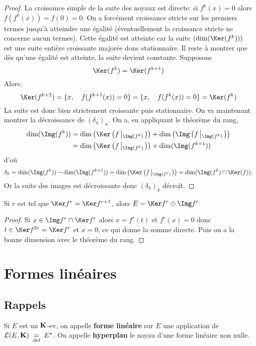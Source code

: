 \begin{proof}
    La croissance simple de la suite des noyaux est directe: si $f^k(x)=0$ alors $f(f^k(x))=f(0)=0$. On a forcément croissance stricte sur les premiers termes jusqu'à atteindre une égalité (éventuellement la croissance stricte ne concerne aucun termes). Cette égalité est atteinte car la suite $(\dim(\Ker(f^k)))$ est une suite entière croissante majorée donc stationnaire. Il reste à montrer que dès qu'une égalité est atteinte, la suite devient constante. Supposons \[
    \Ker(f^k)=\Ker(f^{k+1})
\]
Alors, \[
    \Ker(f^{k+2})=\{x, \quad f(f^{k+1}(x))=0\}=\{x, \quad f(f^k(x))=0\}=\Ker(f^k)
\]
La suite est donc bien strictement croissante puis stationnaire. On va maintenant montrer la décroissance de $(\delta_n)_n$. On a, en appliquant le théorème du rang,
\begin{align*}
    \dim(\Img(f^k))&=\dim\left(\Ker\left(f\left|_{\Img(f^k)}\right.\right)\right)+\dim\left(\Img\left(f\left|_{\Img(f^k)}\right.\right)\right)\\
    &=\dim\left(\Ker\left(f\left|_{\Img(f^k)}\right.\right)\right)+\dim(\Img(f^{k+1}))
\end{align*}
d'où \[
    \delta_k=\dim(\Img(f^k))-\dim(\Img(f^{k+1}))=\dim\left(\Ker\left(f\left|_{\Img(f^k)}\right.\right)\right)=\dim(\Img(f^k)\cap \Ker(f)).
\]
Or la suite des images est décroissante donc $(\delta_k)_k$ décroît.
\end{proof}

\begin{res}
    Si $r$ est tel que  $\Ker f^r=\Ker f^{r+1}$, alors  $E=\Ker f^r\oplus \Img f^r$
\end{res}

\begin{proof}
    Si $x \in  \Img f^r\cap \Ker f^r$ alors $x=f^r(t)$ et  $f^r(x)=0$ donc  $t \in  \Ker f^{2r}=\Ker f^r$ et $x=0$, ce qui donne la somme directe. Puis on a la bonne dimension avec le théorème du rang.
\end{proof}

\section{Formes linéaires}

\subsection{Rappels}

\begin{dfn}
    Si $E$ est un  $\mathbf K$-ev, on appelle \textbf{forme linéaire} sur $E$ une application de  $\mathcal  L(E, \mathbf K)\;\underset{\text{def}}=\; E^\star$. On appelle  \textbf{hyperplan} le noyau d'une forme linéaire non nulle.
\end{dfn}

